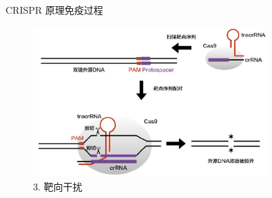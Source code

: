 \documentclass{beamer}
\begin{document}
\begin{frame}{CRISPR 原理}{免疫过程}
		
	\begin{figure}
		\centering
		\includegraphics[width=0.8\textwidth]{img/infect_stage3.jpeg}
		\caption{3. 靶向干扰}
	\end{figure}






\end{frame}

\end{document}
